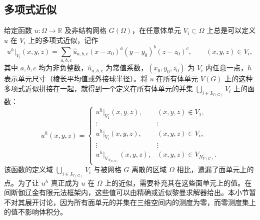 \subsection{多项式近似}

给定函数 $u\colon\varOmega\to\mathbb{R}$ 及非结构网格 $G(\varOmega)$，在任意体单元
$V_{i}\subset\varOmega$ 上总是可以定义 $u$ 在 $V_{i}$ 上的多项式近似，记作
\begin{equation}
u^{h}|_{V_{i}}(x,y,z)=\sum_{a,b,c}\hat{u}_{a,b,c}(x-x_{0})^{a}(y-y_{0})^{b}(z-z_{0})^{c},\qquad(x,y,z)\in V_{i},
\end{equation}
其中 $a,b,c$ 均为非负整数，$\hat{u}_{a,b,c}$ 为常值系数，$(x_{0},y_{0},z_{0})$
为 $V_{i}$ 内任意一点，$h$ 表示单元尺寸（棱长平均值或外接球半径）。将
$u$ 在所有体单元 $V(G)$ 上的这种多项式近似拼接在一起，就得到一个定义在所有体单元的并集 $\bigcup_{i\in I_{V(G)}}V_{i}$
上的函数：
\begin{equation}
u^{h}(x,y,z)=\begin{cases}
u^{h}|_{V_{1}}(x,y,z), & (x,y,z)\in V_{1},\\
\vdots & \vdots\\
u^{h}|_{V_{i}}(x,y,z), & (x,y,z)\in V_{i},\\
\vdots & \vdots\\
u^{h}|_{V_{N_{V(G)}}}(x,y,z), & (x,y,z)\in V_{N_{V(G)}}.
\end{cases}\label{eq:piecewise_polynomial}
\end{equation}
该函数的定义域 $\bigcup_{i\in I_{V(G)}}V_{i}$ 与被网格 $G$ 离散的区域 $\varOmega$
相比，遗漏了面单元上的点。为了让 $u^{h}$ 真正成为 $u$ 在 $\varOmega$ 上的近似，需要补充其在这些面单元上的值。在间断伽辽金有限元法框架内，这些值可以由精确或近似黎曼求解器给出。本小节暂不对其展开讨论，因为所有面单元的并集在三维空间内的测度为零，而零测度集上的值不影响体积分。

